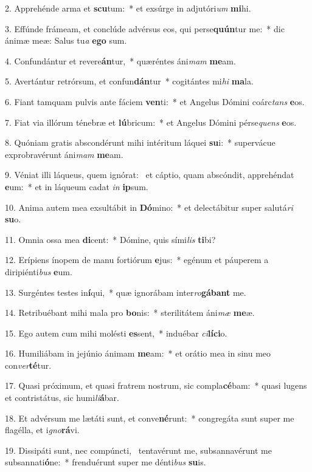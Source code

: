 2. Apprehénde arma et \textbf{scu}tum:~*  et exsúrge in adjutóri\textit{um} \textbf{mi}hi.\

3. Effúnde frámeam, et conclúde advérsus eos, qui perse\textbf{quún}tur me:~*  dic ánimæ meæ: Salus tu\textit{a} \textbf{e}\textbf{go} sum.\

4. Confundántur et revere\textbf{án}tur,~*  quæréntes áni\textit{mam} \textbf{me}am.\

5. Avertántur retrórsum, et confun\textbf{dán}tur~*  cogitántes mi\textit{hi} \textbf{ma}la.\

6. Fiant tamquam pulvis ante fáciem \textbf{ven}ti:~*  et Angelus Dómini coárc\textit{tans} \textbf{e}os.\

7. Fiat via illórum ténebræ et \textbf{lú}bricum:~*  et Angelus Dómini pérse\textit{quens} \textbf{e}os.\

8. Quóniam gratis abscondérunt mihi intéritum láquei \textbf{su}i:~*  supervácue exprobravérunt áni\textit{mam} \textbf{me}am.\

9. Véniat illi láqueus, quem ignórat: \dag\  et cáptio, quam abscóndit, apprehéndat \textbf{e}um:~*  et in láqueum cadat \textit{in} \textbf{ip}sum.\

10. Anima autem mea exsultábit in \textbf{Dó}mino:~*  et delectábitur super salutá\textit{ri} \textbf{su}o.\

11. Omnia ossa mea \textbf{di}cent:~*  Dómine, quis sími\textit{lis} \textbf{ti}bi?\

12. Erípiens ínopem de manu fortiórum \textbf{e}jus:~*  egénum et páuperem a diripiénti\textit{bus} \textbf{e}um.\

13. Surgéntes testes in\textbf{í}qui,~*  quæ ignorábam inter\textit{ro}\textbf{gá}\textbf{bant} me.\

14. Retribuébant mihi mala pro \textbf{bo}nis:~*  sterilitátem áni\textit{mæ} \textbf{me}æ.\

15. Ego autem cum mihi molésti \textbf{es}sent,~*  induébar \textit{ci}\textbf{lí}\textbf{ci}o.\

16. Humiliábam in jejúnio ánimam \textbf{me}am:~*  et orátio mea in sinu meo con\textit{ver}\textbf{té}tur.\

17. Quasi próximum, et quasi fratrem nostrum, sic compla\textbf{cé}bam:~*  quasi lugens et contristátus, sic humi\textit{li}\textbf{á}bar.\

18. Et advérsum me lætáti sunt, et conve\textbf{né}runt:~*  congregáta sunt super me flagélla, et i\textit{gno}\textbf{rá}vi.\

19. Dissipáti sunt, nec compúncti, \dag\  tentavérunt me, subsannavérunt me subsannati\textbf{ó}ne:~*  frenduérunt super me dénti\textit{bus} \textbf{su}is.\

